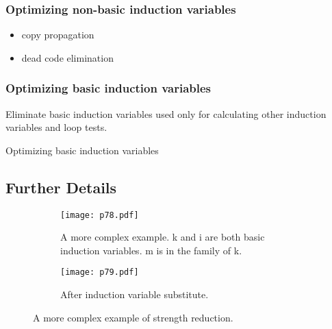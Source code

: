 \subsubsection{Optimizing non-basic induction variables}


\begin{itemize}
\item copy propagation
\item dead code elimination
\end{itemize}


\subsubsection{Optimizing basic induction variables}

Eliminate basic induction variables used only for calculating other induction variables and loop tests.   
\begin{algorithm}[H]
    \caption{Optimizing basic induction variables}\label{alg:Optimizing basic induction variables}
    \begin{algorithmic}


    \end{algorithmic}
    \end{algorithm}

\subsection{Further Details}


\begin{figure}[H]
    \centering
    \begin{subfigure}{0.7\textwidth}
    \centering
        \texttt{[image: p78.pdf]}
        \caption{A more complex example. k and i are both basic induction variables.
         m is in the family of k.}
        \label{fig:p78}
    \end{subfigure}
    \begin{subfigure}{\textwidth}
    \centering
        \texttt{[image: p79.pdf]}
        \caption{After induction variable substitute.}
        \label{fig:p79}
    \end{subfigure}
    
    \caption{A more complex example of strength reduction.}
       \label{fig:p74-76}
\end{figure}

